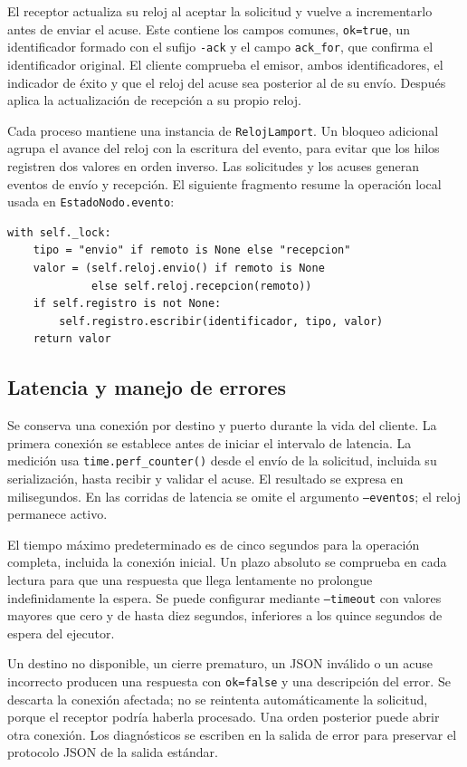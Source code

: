 \documentclass[11pt,a4paper]{article}
\begin{document}
El receptor actualiza su reloj al aceptar la solicitud y vuelve a
incrementarlo antes de enviar el acuse. Este contiene los campos comunes,
\texttt{ok=true}, un identificador formado con el sufijo \texttt{-ack}
y el campo \texttt{ack\_for}, que confirma el identificador original.
El cliente comprueba el emisor, ambos identificadores, el indicador de
éxito y que el reloj del acuse sea posterior al de su envío. Después
aplica la actualización de recepción a su propio reloj.

Cada proceso mantiene una instancia de \texttt{RelojLamport}. Un bloqueo
adicional agrupa el avance del reloj con la escritura del evento, para
evitar que los hilos registren dos valores en orden inverso. Las solicitudes
y los acuses generan eventos de envío y recepción. El siguiente fragmento
resume la operación local usada en \texttt{EstadoNodo.evento}:

\begin{verbatim}
with self._lock:
    tipo = "envio" if remoto is None else "recepcion"
    valor = (self.reloj.envio() if remoto is None
             else self.reloj.recepcion(remoto))
    if self.registro is not None:
        self.registro.escribir(identificador, tipo, valor)
    return valor
\end{verbatim}

\subsection{Latencia y manejo de errores}

Se conserva una conexión por destino y puerto durante la vida del cliente.
La primera conexión se establece antes de iniciar el intervalo de latencia.
La medición usa \texttt{time.perf\_counter()} desde el envío de la solicitud,
incluida su serialización, hasta recibir y validar el acuse. El resultado
se expresa en milisegundos. En las corridas de latencia se omite el argumento
\texttt{--eventos}; el reloj permanece activo.

El tiempo máximo predeterminado es de cinco segundos para la operación
completa, incluida la conexión inicial. Un plazo absoluto se comprueba
en cada lectura para que una respuesta que llega lentamente no prolongue
indefinidamente la espera. Se puede configurar mediante \texttt{--timeout}
con valores mayores que cero y de hasta diez segundos, inferiores a los
quince segundos de espera del ejecutor.

Un destino no disponible, un cierre prematuro, un JSON inválido o un acuse
incorrecto producen una respuesta con \texttt{ok=false} y una descripción
del error. Se descarta la conexión afectada; no se reintenta automáticamente
la solicitud, porque el receptor podría haberla procesado. Una orden
posterior puede abrir otra conexión. Los diagnósticos se escriben en la
salida de error para preservar el protocolo JSON de la salida estándar.
\end{document}
